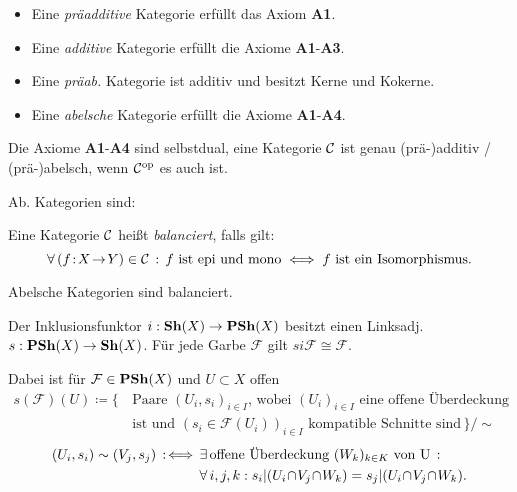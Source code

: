 \documentclass{cheat-sheet}
\newcommand{\Fais}{\mathcal{F}} %
\begin{document}
\begin{defn}
  \begin{itemize}
    \item Eine \emph{präadditive} Kategorie erfüllt das Axiom \textbf{A1}. \\
    \item Eine \emph{additive} Kategorie erfüllt die Axiome \textbf{A1}-\textbf{A3}. \\
    \item Eine \emph{präab.} Kategorie ist additiv und besitzt Kerne und Kokerne.
    \item Eine \emph{abelsche} Kategorie erfüllt die Axiome \textbf{A1}-\textbf{A4}.
  \end{itemize}
\end{defn}

\begin{bem}
  Die Axiome \textbf{A1}-\textbf{A4} sind selbstdual, \dh{} eine Kategorie $\mathcal{C}$ ist genau (prä-)additiv / (prä-)abelsch, wenn $\mathcal{C}^{\mathrm{op}}$ es auch ist.
\end{bem}

\begin{bspe}
  Ab. Kategorien sind: \enspace
  \inlineitem{$\AbGrp$,} \enspace
   \enspace
\end{bspe}

\begin{defn}
  Eine Kategorie $\mathcal{C}$ heißt \emph{balanciert}, falls gilt:
  \[
    \forall \, {(f \!:\! X \!\to\! Y) \in \mathcal{C}} \,:\,
    f \text{ ist epi und mono} \iff f \text{ ist ein Isomorphismus.}
  \]
\end{defn}

\begin{prop}
  Abelsche Kategorien sind balanciert.
\end{prop}


\begin{thm}
  Der Inklusionsfunktor $i : \mathbf{Sh}(X) \to \mathbf{PSh}(X)$ besitzt einen Linksadj. $s : \mathbf{PSh}(X) \to \mathbf{Sh}(X)$. Für jede Garbe $\Fais$ gilt $si \Fais \cong \Fais$.
\end{thm}

\begin{bem}
  Dabei ist für $\Fais \in \PSh(X)$ und $U \subset X$ offen
  \begin{align*}
    s(\Fais)(U) \coloneqq \{ \, & \text{Paare $(U_i, s_i)_{i \in I}$, wobei $(U_i)_{i \in I}$ eine offene Überdeckung} \\
     & \text{ist und $(s_i \in \Fais(U_i))_{i \in I}$ kompatible Schnitte sind} \, \} / {\sim}
  \end{align*}\vspace{-16pt}
  \begin{align*}
    (U_i, s_i) \sim (V_j, s_j) \!\! \coloniff \, & \ex{\text{offene Überdeckung $(W_k)_{k \in K}$ von U}} \\
    & \fa{i, j, k\!}\! s_i|(U_i \!\cap\! V_j \!\cap\! W_k) = s_j|(U_i \!\cap\! V_j \!\cap\! W_k).
  \end{align*}
\end{bem}
\end{document}
